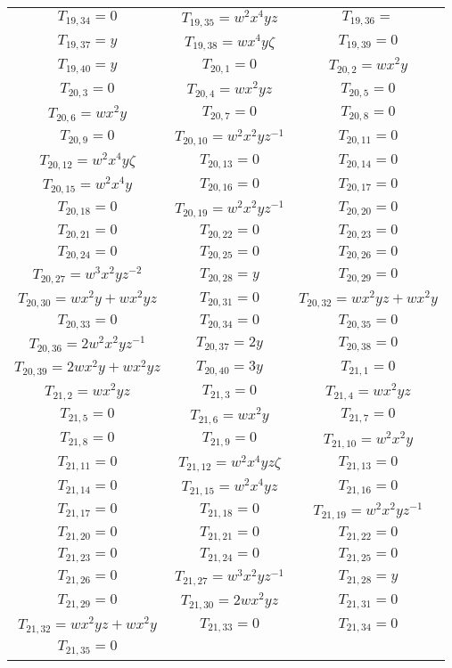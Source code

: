 \begin{longtable}{|c|c|c|}
$T_{19,34}= 0$&
$T_{19,35}= w^2x^4yz$&
$T_{19,36}= $\\
$T_{19,37}= y$&
$T_{19,38}= wx^4y\zeta$&
$T_{19,39}= 0$\\
$T_{19,40}= y$&
$T_{20,1}= 0$&
$T_{20,2}= wx^2y$\\
$T_{20,3}= 0$&
$T_{20,4}= wx^2yz$&
$T_{20,5}= 0$\\
$T_{20,6}= wx^2y$&
$T_{20,7}= 0$&
$T_{20,8}= 0$\\
$T_{20,9}= 0$&
$T_{20,10}= w^2x^2yz^{-1}$&
$T_{20,11}= 0$\\
$T_{20,12}= w^2x^4y\zeta$&
$T_{20,13}= 0$&
$T_{20,14}= 0$\\
$T_{20,15}= w^2x^4y$&
$T_{20,16}= 0$&
$T_{20,17}= 0$\\
$T_{20,18}= 0$&
$T_{20,19}= w^2x^2yz^{-1}$&
$T_{20,20}= 0$\\
$T_{20,21}= 0$&
$T_{20,22}= 0$&
$T_{20,23}= 0$\\
$T_{20,24}= 0$&
$T_{20,25}= 0$&
$T_{20,26}= 0$\\
$T_{20,27}= w^3x^2yz^{-2}$&
$T_{20,28}= y$&
$T_{20,29}= 0$\\
$T_{20,30}= wx^2y+wx^2yz$&
$T_{20,31}= 0$&
$T_{20,32}= wx^2yz+wx^2y$\\
$T_{20,33}= 0$&
$T_{20,34}= 0$&
$T_{20,35}= 0$\\
$T_{20,36}= 2w^2x^2yz^{-1}$&
$T_{20,37}= 2y$&
$T_{20,38}= 0$\\
$T_{20,39}= 2wx^2y+wx^2yz$&
$T_{20,40}= 3y$&
$T_{21,1}= 0$\\
$T_{21,2}= wx^2yz$&
$T_{21,3}= 0$&
$T_{21,4}= wx^2yz$\\
$T_{21,5}= 0$&
$T_{21,6}= wx^2y$&
$T_{21,7}= 0$\\
$T_{21,8}= 0$&
$T_{21,9}= 0$&
$T_{21,10}= w^2x^2y$\\
$T_{21,11}= 0$&
$T_{21,12}= w^2x^4yz\zeta$&
$T_{21,13}= 0$\\
$T_{21,14}= 0$&
$T_{21,15}= w^2x^4yz$&
$T_{21,16}= 0$\\
$T_{21,17}= 0$&
$T_{21,18}= 0$&
$T_{21,19}= w^2x^2yz^{-1}$\\
$T_{21,20}= 0$&
$T_{21,21}= 0$&
$T_{21,22}= 0$\\
$T_{21,23}= 0$&
$T_{21,24}= 0$&
$T_{21,25}= 0$\\
$T_{21,26}= 0$&
$T_{21,27}= w^3x^2yz^{-1}$&
$T_{21,28}= y$\\
$T_{21,29}= 0$&
$T_{21,30}= 2wx^2yz$&
$T_{21,31}= 0$\\
$T_{21,32}= wx^2yz+wx^2y$&
$T_{21,33}= 0$&
$T_{21,34}= 0$\\
$T_{21,35}= 0$&

\end{longtable}
